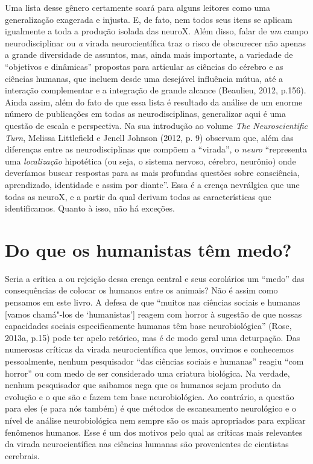 Uma lista desse gênero certamente soará para alguns leitores como uma
generalização exagerada e injusta. E, de fato, nem todos seus itens se
aplicam igualmente a toda a produção isolada das neuroX. Além disso,
falar de \emph{um} campo neurodisciplinar ou \emph{a} virada
neurocientífica traz o risco de obscurecer não apenas a grande
diversidade de assuntos, mas, ainda mais importante, a variedade de
``objetivos e dinâmicas'' propostas para articular as ciências do
cérebro e as ciências humanas, que incluem desde uma desejável
influência mútua, até a interação complementar e a integração de grande
alcance (Beaulieu, 2012, p.156). Ainda assim, além do fato de que essa
lista é resultado da análise de um enorme número de publicações em todas
as neurodisciplinas, generalizar aqui é uma questão de escala e
perspectiva. Na sua introdução ao volume \emph{The Neuroscientific
Turn}, Melissa Littlefield e Jenell Johnson (2012, p. 9) observam que,
além das diferenças entre as neurodisciplinas que compõem a ``virada'',
o \emph{neuro} ``representa uma \emph{localização} hipotética (ou seja,
o sistema nervoso, cérebro, neurônio) onde deveríamos buscar respostas
para as mais profundas questões sobre consciência, aprendizado,
identidade e assim por diante''. Essa é a crença nevrálgica que une
todas as neuroX, e a partir da qual derivam todas as características que
identificamos. Quanto à isso, não há exceções.

\chapter{Do que os humanistas têm medo?}

Seria a crítica a ou rejeição dessa crença central e seus corolários um
``medo'' das consequências de colocar os humanos entre os animais? Não é
assim como pensamos em este livro. A defesa de que ``muitos nas ciências
sociais e humanas {[}vamos chamá"-los de `humanistas'{]} reagem com
horror à sugestão de que nossas capacidades sociais especificamente
humanas têm base neurobiológica'' (Rose, 2013a, p.15) pode ter apelo
retórico, mas é de modo geral uma deturpação. Das numerosas críticas da
virada neurocientífica que lemos, ouvimos e conhecemos pessoalmente,
nenhum pesquisador ``das ciências sociais e humanas'' reagiu ``com
horror'' ou com medo de ser considerado uma criatura biológica. Na
verdade, nenhum pesquisador que saibamos nega que os humanos sejam
produto da evolução e o que são e fazem tem base neurobiológica. Ao
contrário, a questão para eles (e para nós também) é que métodos de
escaneamento neurológico e o nível de análise neurobiológica nem sempre
são os mais apropriados para explicar fenômenos humanos. Esse é um dos
motivos pelo qual as críticas mais relevantes da virada neurocientífica
nas ciências humanas são provenientes de cientistas cerebrais.


